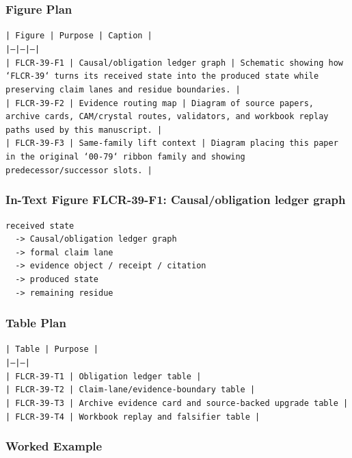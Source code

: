\documentclass[11pt]{article}
\begin{document}
\subsubsection*{Figure Plan}

\noindent\texttt{| Figure | Purpose | Caption |}\\
\noindent\texttt{|---|---|---|}\\
\noindent\texttt{| FLCR-39-F1 | Causal/obligation ledger graph | Schematic showing how `FLCR-39` turns its received state into the produced state while preserving claim lanes and residue boundaries. |}\\
\noindent\texttt{| FLCR-39-F2 | Evidence routing map | Diagram of source papers, archive cards, CAM/crystal routes, validators, and workbook replay paths used by this manuscript. |}\\
\noindent\texttt{| FLCR-39-F3 | Same-family lift context | Diagram placing this paper in the original `00-79` ribbon family and showing predecessor/successor slots. |}\\

\subsubsection*{In-Text Figure FLCR-39-F1: Causal/obligation ledger graph}

\begin{verbatim}
received state
  -> Causal/obligation ledger graph
  -> formal claim lane
  -> evidence object / receipt / citation
  -> produced state
  -> remaining residue
\end{verbatim}

\subsubsection*{Table Plan}

\noindent\texttt{| Table | Purpose |}\\
\noindent\texttt{|---|---|}\\
\noindent\texttt{| FLCR-39-T1 | Obligation ledger table |}\\
\noindent\texttt{| FLCR-39-T2 | Claim-lane/evidence-boundary table |}\\
\noindent\texttt{| FLCR-39-T3 | Archive evidence card and source-backed upgrade table |}\\
\noindent\texttt{| FLCR-39-T4 | Workbook replay and falsifier table |}\\

\subsubsection*{Worked Example}
\end{document}
